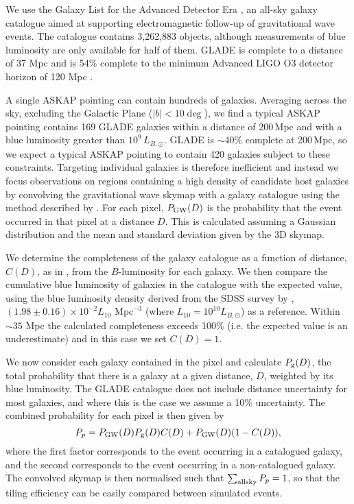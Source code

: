 We use the Galaxy List for the Advanced Detector Era \citep[GLADE,][]{2018MNRAS.479.2374D}, an all-sky galaxy catalogue aimed at supporting electromagnetic follow-up of gravitational wave events. The catalogue contains 3,262,883 objects, although measurements of blue luminosity are only available for half of them. GLADE is complete to a distance of 37 Mpc and is 54\% complete to the minimum Advanced LIGO O3 detector horizon of 120 Mpc \citep{2018MNRAS.479.2374D}.



A single ASKAP pointing can contain hundreds of galaxies. Averaging across the sky, excluding the Galactic Plane ($|b|<10\deg$), we find a typical ASKAP pointing contains 169 GLADE galaxies within a distance of 200\,Mpc and with a blue luminosity greater than $10^9$\,$L_{B,\odot}$. GLADE is $\sim 40\%$ complete at 200\,Mpc, so we expect a typical ASKAP pointing to contain 420 galaxies subject to these constraints. Targeting individual galaxies is therefore inefficient and instead we focus observations on regions containing a high density of candidate host galaxies by convolving the gravitational wave skymap with a galaxy catalogue using the method described by \citet{2016MNRAS.462.1591E}. For each pixel, $P_{\rm GW}(D)$ is the probability that the event occurred in that pixel at a distance $D$. This is calculated assuming a Gaussian distribution and the mean and standard deviation given by the 3D skymap.

We determine the completeness of the galaxy catalogue as a function of distance, $C(D)$, as in \cite{2011CQGra..28h5016W}, from the $B$-luminosity for each galaxy. We then compare the cumulative blue luminosity of galaxies in the catalogue with the expected value, using the blue luminosity density derived from the SDSS survey by \citet{2008ApJ...675.1459K}, $(1.98 \pm 0.16)\times 10^{-2}L_{10}\textrm{ Mpc}^{-3}$ (where $L_{10}=10^{10}L_{B,\odot}$) as a reference. Within $\sim 35$ Mpc the calculated completeness exceeds 100\% (i.e. the expected value is an underestimate) and in this case we set $C(D)=1$.

We now consider each galaxy contained in the pixel and calculate $P_{\rm g}(D)$, the total probability that there is a galaxy at a given distance, $D$, weighted by its blue luminosity. The GLADE catalogue does not include distance uncertainty for most galaxies, and where this is the case we assume a 10\% uncertainty. The combined probability for each pixel is then given by
\begin{equation}
	\label{eq:convolved_probability}
	P_p = P_{\rm GW}(D)P_{\rm g}(D)C(D) + P_{\rm GW}(D)(1-C(D)),
\end{equation}
where the first factor corresponds to the event occurring in a catalogued galaxy, and the second corresponds to the event occurring in a non-catalogued galaxy. The convolved skymap is then normalised such that $\sum_{\rm all sky} P_p = 1$, so that the tiling efficiency can be easily compared between simulated events.

